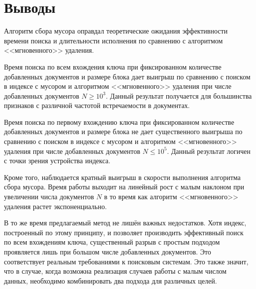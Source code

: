 \newpage
\section{Выводы}

Алгоритм сбора мусора оправдал теоретические ожидания эффективности времени
поиска и длительности исполнения по сравнению с алгоритмом <<мгновенного>>
удаления. 

Время поиска по всем вхождения ключа при фиксированном количестве
добавленных документов и размере блока дает выигрыш по сравнению
с поиском в индексе с мусором и алгоритмом <<мгновенного>> удаления при числе
добавленных документов $N \ge 10^3$. Данный результат получается для большинства
признаков с различной частотой встречаемости в документах.

Время поиска по первому вхождению ключа при фиксированном количестве
добавленных документов и размере блока не дает существенного выигрыша по
сравнению с поиском в индексе с мусором и алгоритмом <<мгновенного>> удаления
при числе добавленных документов $N \leq 10^5$. Данный результат логичен с точки
зрения устройства индекса.

Кроме того, наблюдается кратный выигрыш в скорости выполнения алгоритма сбора
мусора. Время работы выходит на линейный рост с малым наклоном при увеличении
числа документов $N$ в то время как алгоритм <<мгновенного>> удаления растет
экспоненциально.

В то же время предлагаемый метод не лишён важных недостатков. Хотя индекс,
построенный по этому принципу, и позволяет производить эффективный поиск по
всем вхождениям ключа, существенный разрыв с простым подходом проявляется лишь
при большом числе добавленных документов. Это соответствует реальным требованиями
к поисковым системам. Это также значит, что в случае, когда возможна реализация
случаев работы с малым числом данных, необходимо комбинировать два подхода для
различных целей.
